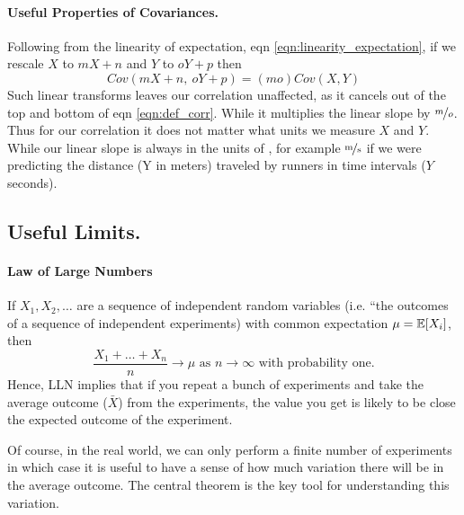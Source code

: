 
\paragraph{Useful Properties of Covariances.}
Following from the linearity of expectation, eqn
\eqref{eqn:linearity_expectation}, if we rescale $X$ to $mX+n$ and
$Y$ to $oY+p$ then
\begin{equation}
Cov(mX+n,~oY+p) = (mo) Cov(X,Y) 
\end{equation}
Such linear transforms leaves our correlation unaffected, as it
cancels out of the top and bottom of eqn \eqref{eqn:def_corr}. While
it multiplies the linear slope by $\nicefrac{m}{o}$. Thus
for our correlation it does not matter what units we measure $X$ and
$Y$. While our linear slope is always in the units of
, for example
$\nicefrac{\textrm{m}}{\textrm{s}}$ if we were predicting the
distance (Y in meters) traveled by runners in time intervals ($Y$ seconds).

\subsection*{Useful Limits.}
\paragraph{Law of Large Numbers} If $X_1,X_2,\dots$ are a sequence of independent random variables (i.e. ``the outcomes of a sequence of independent experiments) with common expectation $\mu= \mathbb{E}[X_i]$, then 
\begin{equation}
\frac{X_1+\dots +X_n}{n} \to \mu \mbox{ as }n\to \infty \mbox{ with
  probability one.}
\end{equation}
Hence, LLN implies that if you repeat a bunch of experiments and take
the average outcome ($\bar{X}$) from the experiments, the value you get is likely to be close the expected outcome of the experiment. 

Of course, in the real world, we can only perform a finite number of experiments in which case it is useful to have a sense of how much variation there will be in the average outcome. The central theorem is the key tool for understanding this variation. 

